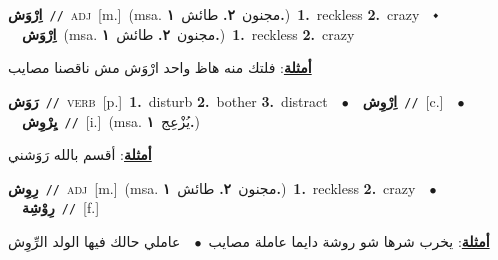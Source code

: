 \documentclass[10pt,a4paper,twoside]{article} %
\begin{document}
\begin{multicols}{2}
{\setlength\topsep{0pt}\textbf{\foreignlanguage{arabic}{اِرْوَش}}\ {\color{gray}\texttt{//}\color{black}}\ \textsc{adj}\ [m.]\ \color{gray}(msa. \foreignlanguage{arabic}{مجنون}~\foreignlanguage{arabic}{\textbf{٢.}}  \foreignlanguage{arabic}{طائش}~\foreignlanguage{arabic}{\textbf{١.}})\color{black}\ \textbf{1.}~reckless  \textbf{2.}~crazy\ \ $\smblkdiamond$\ \ \setlength\topsep{0pt}\textbf{\foreignlanguage{arabic}{اِرْوَش}}\ \color{gray}(msa. \foreignlanguage{arabic}{مجنون}~\foreignlanguage{arabic}{\textbf{٢.}}  \foreignlanguage{arabic}{طائش}~\foreignlanguage{arabic}{\textbf{١.}})\color{black}\ \textbf{1.}~reckless  \textbf{2.}~crazy\  \begin{flushright}\color{gray}\foreignlanguage{arabic}{\textbf{\underline{\foreignlanguage{arabic}{أمثلة}}}: فلتك منه هاظ واحد ارْوَش مش ناقصنا مصايب}\end{flushright}\color{black}} \vspace{2mm}

{\setlength\topsep{0pt}\textbf{\foreignlanguage{arabic}{رَوَش}}\ {\color{gray}\texttt{//}\color{black}}\ \textsc{verb}\ [p.]\ \textbf{1.}~disturb  \textbf{2.}~bother  \textbf{3.}~distract\ \ $\bullet$\ \ \setlength\topsep{0pt}\textbf{\foreignlanguage{arabic}{اِرْوِش}}\ {\color{gray}\texttt{//}\color{black}}\ [c.]\ \ $\bullet$\ \ \setlength\topsep{0pt}\textbf{\foreignlanguage{arabic}{يِرْوِش}}\ {\color{gray}\texttt{//}\color{black}}\ [i.]\ \color{gray}(msa. \foreignlanguage{arabic}{يُزْعِج}~\foreignlanguage{arabic}{\textbf{١.}})\color{black}\  \begin{flushright}\color{gray}\foreignlanguage{arabic}{\textbf{\underline{\foreignlanguage{arabic}{أمثلة}}}: أقسم بالله رَوَشني}\end{flushright}\color{black}} \vspace{2mm}

{\setlength\topsep{0pt}\textbf{\foreignlanguage{arabic}{رِوِش}}\ {\color{gray}\texttt{//}\color{black}}\ \textsc{adj}\ [m.]\ \color{gray}(msa. \foreignlanguage{arabic}{مجنون}~\foreignlanguage{arabic}{\textbf{٢.}}  \foreignlanguage{arabic}{طائش}~\foreignlanguage{arabic}{\textbf{١.}})\color{black}\ \textbf{1.}~reckless  \textbf{2.}~crazy\ \ $\bullet$\ \ \setlength\topsep{0pt}\textbf{\foreignlanguage{arabic}{رِوْشِة}}\ {\color{gray}\texttt{//}\color{black}}\ [f.]\  \begin{flushright}\color{gray}\foreignlanguage{arabic}{\textbf{\underline{\foreignlanguage{arabic}{أمثلة}}}: يخرب شرها شو روشة دايما عاملة مصايب\ $\bullet$\ \  عاملي حالك فيها الولد الرِّوِش}\end{flushright}\color{black}} \vspace{2mm}


\end{multicols}
\end{document}
